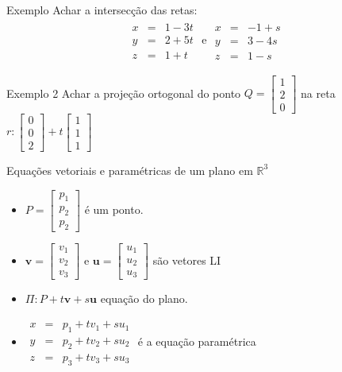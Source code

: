 \documentclass{beamer}
\begin{document}
\begin{frame}{Exemplo}
  Achar a intersecção das retas:
  \begin{gather*}
    \begin{array}{ccc}
      x &= &1-3t \\
      y & = & 2+5t\\
      z & = & 1+t
    \end{array}\text{ e }\begin{array}{ccc}
      x &=& -1+s \\
      y &=& 3-4s \\
      z &=& 1-s
    \end{array}
  \end{gather*}
\end{frame}

\begin{frame} {Exemplo 2}
  Achar a projeção ortogonal do ponto $Q = \begin{bmatrix}
    1 \\ 2 \\ 0
  \end{bmatrix}$ na reta $r: \begin{bmatrix}
    0 \\ 0 \\ 2
  \end{bmatrix}+ t\begin{bmatrix}
    1 \\ 1 \\ 1
  \end{bmatrix}$
\end{frame}

\begin{frame}{Equações vetoriais e paramétricas de um plano em $\mathbb{R}^3$}
  \begin{itemize}
    \item $P = \begin{bmatrix}
      p_1 \\ p_2 \\ p_2
    \end{bmatrix}$ é um ponto.
    \item $\mathbf{v}=\begin{bmatrix}
      v_1 \\ v_2 \\ v_3
    \end{bmatrix}$ e $\mathbf{u} =\begin{bmatrix}
      u_1 \\ u_2 \\ u_3
    \end{bmatrix}$ são vetores LI 
    \item $\Pi:P+t\mathbf{v} + s\mathbf{u}$ equação do plano.
    \item $\begin{array}{ccc}
    x&=&p_1 + tv_1 + su_1 \\
    y&=& p_2 + tv_2 + su_2 \\
    z&=& p_3 + tv_3 + su_3
  \end{array}$ é a equação paramétrica
  \end{itemize}
\end{frame}
\end{document}

